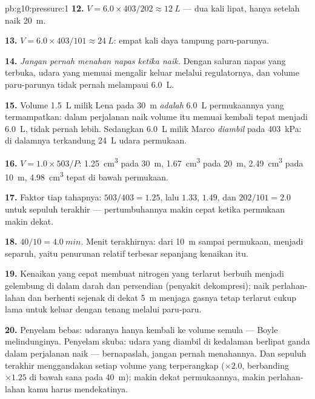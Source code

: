 \begin{solution}{pb:g10:pressure:1}
\textbf{12.} $V = 6.0 \times 403/202 \approx \qty{12}{L}$ --- dua kali
lipat, hanya setelah naik \qty{20}{m}.

\textbf{13.} $V = 6.0 \times 403/101 \approx \qty{24}{L}$: empat kali
daya tampung paru-parunya.

\textbf{14.} \emph{Jangan pernah menahan napas ketika naik.} Dengan
saluran napas yang terbuka, udara yang memuai mengalir keluar melalui
regulatornya, dan volume paru-parunya tidak pernah melampaui
\qty{6.0}{L}.

\textbf{15.} Volume \qty{1.5}{L} milik Lena pada \qty{30}{m}
\emph{adalah} \qty{6.0}{L} permukaannya yang termampatkan: dalam
perjalanan naik volume itu memuai kembali tepat menjadi \qty{6.0}{L},
tidak pernah lebih. Sedangkan \qty{6.0}{L} milik Marco \emph{diambil}
pada \qty{403}{kPa}: di dalamnya terkandung \qty{24}{L} udara
permukaan.

\textbf{16.} $V = 1.0 \times 503/P$: \qty{1.25}{cm^3} pada \qty{30}{m},
\qty{1.67}{cm^3} pada \qty{20}{m}, \qty{2.49}{cm^3} pada \qty{10}{m},
\qty{4.98}{cm^3} tepat di bawah permukaan.

\textbf{17.} Faktor tiap tahapnya: $503/403 = 1.25$, lalu $1.33$,
$1.49$, dan $202/101 = 2.0$ untuk sepuluh  terakhir ---
pertumbuhannya makin cepat ketika permukaan makin dekat.

\textbf{18.} $40/10 = \qty{4.0}{min}$. Menit terakhirnya: dari
\qty{10}{m} sampai permukaan,  menjadi separuh, yaitu
penurunan relatif terbesar sepanjang kenaikan itu.

\textbf{19.} Kenaikan yang cepat membuat nitrogen yang terlarut
berbuih menjadi gelembung di dalam darah dan persendian (penyakit
dekompresi); naik perlahan-lahan dan berhenti sejenak di dekat
\qty{5}{m} menjaga gasnya tetap terlarut cukup lama untuk keluar
dengan tenang melalui paru-paru.

\textbf{20.} Penyelam bebas: udaranya hanya kembali ke volume semula
--- Boyle melindunginya. Penyelam skuba: udara yang diambil di
kedalaman berlipat ganda dalam perjalanan naik --- bernapaslah, jangan
pernah menahannya. Dan sepuluh  terakhir menggandakan setiap
volume yang terperangkap ($\times 2.0$, berbanding $\times 1.25$ di
bawah sana pada \qty{40}{m}): makin dekat permukaannya, makin
perlahan-lahan kamu harus mendekatinya.
\end{solution}
